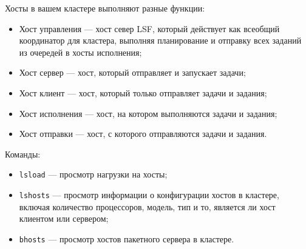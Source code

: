 Хосты в вашем кластере выполняют разные функции:

\begin{itemize}
    \item Хост управления --- хост север LSF, который действует как всеобщий координатор для кластера, выполняя планирование и отправку всех заданий из очередей в хосты исполнения;
    \item Хост сервер --- хост, который отправляет и запускает задачи;
    \item Хост клиент --- хост, который только отправляет задачи и задания;
    \item Хост исполнения --- хост, на котором выполняются задачи и задания;
    \item Хост отправки --- хост, с которого отправляются задачи и задания.
\end{itemize}

Команды:

\begin{itemize}
    \item \lstinline{lsload} --- просмотр нагрузки на хосты;
    \item \lstinline{lshosts} --- просмотр информации о конфигурации хостов в кластере, включая количество процессоров, модель, тип и то, является ли хост клиентом или сервером;
    \item \lstinline{bhosts} --- просмотр хостов пакетного сервера в кластере.
\end{itemize}


